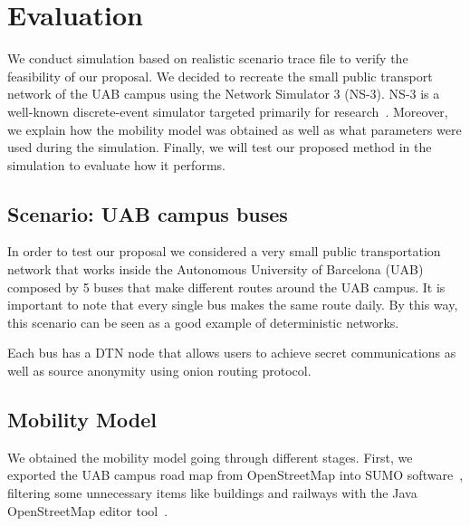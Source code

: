 \section{Evaluation}\label{sec:evaluation}


We conduct simulation based on realistic scenario trace file to verify the feasibility of our proposal. We decided to recreate the small public transport network of the UAB campus using the Network Simulator 3 (NS-3). NS-3 is a well-known discrete-event simulator targeted primarily for research~\cite{ns-3-webpage}. Moreover, we explain how the mobility model was obtained as well as what parameters were used during the simulation. Finally, we will test our proposed method in the simulation to evaluate how it performs.

\subsection{Scenario: UAB campus buses}


In order to test our proposal we considered a very small public transportation network that works inside the Autonomous University of Barcelona (UAB) composed by 5 buses that make different routes around the UAB campus. It is important to note that every single bus makes the same route daily. By this way, this scenario can be seen as a good example of deterministic networks.

Each bus has a DTN node that allows users to achieve secret communications as well as source anonymity using onion routing protocol.

\subsection{Mobility Model}


We obtained the mobility model going through different stages. First, we exported the UAB campus road map from OpenStreetMap into SUMO software~\cite{sumo}, filtering some unnecessary items like buildings and railways with the Java OpenStreetMap editor tool~\cite{josm}.

